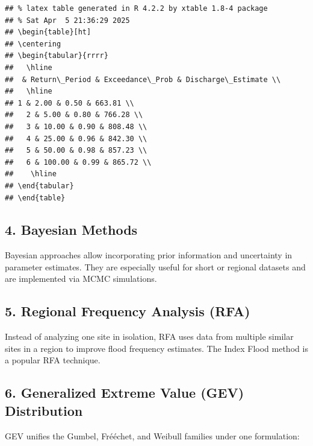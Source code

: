 \documentclass{tufte-handout}\usepackage[]{graphicx}\usepackage[]{xcolor}
\makeatletter
\newenvironment{kframe}{%
 \def\at@end@of@kframe{}%
 \ifinner\ifhmode%
  \def\at@end@of@kframe{\end{minipage}}%
  \begin{minipage}{\columnwidth}%
 \fi\fi%
 \def\FrameCommand##1{\hskip\@totalleftmargin \hskip-\fboxsep
 \colorbox{shadecolor}{##1}\hskip-\fboxsep
     \hskip-\linewidth \hskip-\@totalleftmargin \hskip\columnwidth}%
 \MakeFramed {\advance\hsize-\width
   \@totalleftmargin\z@ \linewidth\hsize
   \@setminipage}}%
 {\par\unskip\endMakeFramed%
 \at@end@of@kframe}
\newenvironment{knitrout}{}{} %
\makeatother
\begin{document}
\begin{knitrout}
\color{fgcolor}\begin{kframe}
\begin{verbatim}
## % latex table generated in R 4.2.2 by xtable 1.8-4 package
## % Sat Apr  5 21:36:29 2025
## \begin{table}[ht]
## \centering
## \begin{tabular}{rrrr}
##   \hline
##  & Return\_Period & Exceedance\_Prob & Discharge\_Estimate \\ 
##   \hline
## 1 & 2.00 & 0.50 & 663.81 \\ 
##   2 & 5.00 & 0.80 & 766.28 \\ 
##   3 & 10.00 & 0.90 & 808.48 \\ 
##   4 & 25.00 & 0.96 & 842.30 \\ 
##   5 & 50.00 & 0.98 & 857.23 \\ 
##   6 & 100.00 & 0.99 & 865.72 \\ 
##    \hline
## \end{tabular}
## \end{table}
\end{verbatim}
\end{kframe}
\end{knitrout}

\subsection{4. Bayesian Methods}

Bayesian approaches allow incorporating prior information and uncertainty in parameter estimates. They are especially useful for short or regional datasets and are implemented via MCMC simulations.

\subsection{5. Regional Frequency Analysis (RFA)}

Instead of analyzing one site in isolation, RFA uses data from multiple similar sites in a region to improve flood frequency estimates. The Index Flood method is a popular RFA technique.

\subsection{6. Generalized Extreme Value (GEV) Distribution}

GEV unifies the Gumbel, Fr\'{e}échet, and Weibull families under one formulation:
\end{document}
